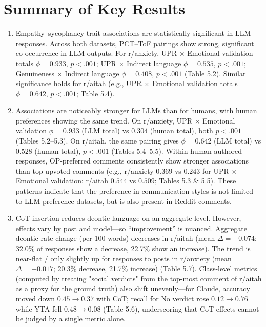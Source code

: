 \section{Summary of Key Results}

\begin{enumerate}
    \item Empathy--sycophancy trait associations are statistically significant in LLM responses.  
    Across both datasets, PCT--ToF pairings show strong, significant co-occurrence in LLM outputs. For r/anxiety, UPR $\times$ Emotional validation totals $\phi = 0.933$, $p < .001$; UPR $\times$ Indirect language $\phi = 0.535$, $p < .001$; Genuineness $\times$ Indirect language $\phi = 0.408$, $p < .001$ (Table 5.2). Similar significance holds for r/aitah (e.g., UPR $\times$ Emotional validation totals $\phi = 0.642$, $p < .001$; Table 5.4). 

    \item Associations are noticeably stronger for LLMs than for humans, with human preferences showing the same trend.  
    On r/anxiety, UPR $\times$ Emotional validation $\phi = 0.933$ (LLM total) vs $0.304$ (human total), both $p < .001$ (Tables 5.2--5.3). On r/aitah, the same pairing gives $\phi = 0.642$ (LLM total) vs $0.528$ (human total), $p < .001$ (Tables 5.4--5.5). Within human-authored responses, OP-preferred comments consistently show stronger associations than top-upvoted comments (e.g., r/anxiety $0.369$ vs $0.243$ for UPR $\times$ Emotional validation; r/aitah $0.544$ vs $0.509$; Tables 5.3 \& 5.5). These patterns indicate that the preference in communication styles is not limited to LLM preference datasets, but is also present in Reddit comments.

    \item CoT insertion reduces deontic language on an aggregate level. However, effects vary by post and model---so ``improvement'' is nuanced.  
    Aggregate deontic rate change (per 100 words) decreases in r/aitah (mean $\Delta = -0.074$; 32.0\% of responses show a decrease, 22.7\% show an increase). The trend is near-flat / only slightly up for responses to posts in r/anxiety (mean $\Delta = +0.017$; 20.3\% decrease, 21.7\% increase) (Table 5.7). Class-level metrics (computed by treating "social verdicts" from the top-most comment of r/aitah as a proxy for the ground truth) also shift unevenly---for Claude, accuracy moved down $0.45 \rightarrow 0.37$ with CoT; recall for No verdict rose $0.12 \rightarrow 0.76$ while YTA fell $0.48 \rightarrow 0.08$ (Table 5.6), underscoring that CoT effects cannot be judged by a single metric alone.
\end{enumerate}

